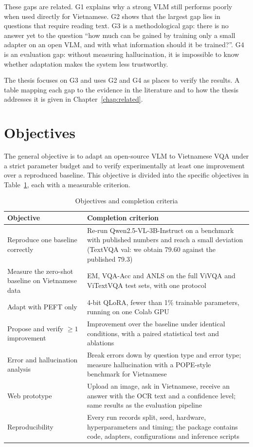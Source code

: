 These gaps are related. G1 explains why a strong VLM still performs poorly when used
directly for Vietnamese. G2 shows that the largest gap lies in questions that require
reading text. G3 is a methodological gap: there is no answer yet to the question
``how much can be gained by training only a small adapter on an open VLM, and with
what information should it be trained?''. G4 is an evaluation gap: without measuring
hallucination, it is impossible to know whether adaptation makes the system less
trustworthy.

The thesis focuses on G3 and uses G2 and G4 as places to verify the results. A table
mapping each gap to the evidence in the literature and to how the thesis addresses it
is given in Chapter~\ref{chap:related}.

\section{Objectives}
\label{sec:intro-objectives}

The general objective is to adapt an open-source VLM to Vietnamese VQA under a strict
parameter budget and to verify experimentally at least one improvement over a
reproduced baseline. This objective is divided into the specific objectives in
Table~\ref{tab:objectives}, each with a measurable criterion.

\begin{table}[htbp]
\caption{Objectives and completion criteria}
\label{tab:objectives}
\centering
\small
\begin{tabular}{p{}p{}}
\toprule
\textbf{Objective} & \textbf{Completion criterion} \\
\midrule
Reproduce one baseline correctly &
Re-run Qwen2.5-VL-3B-Instruct on a benchmark with published numbers and reach a small
deviation (TextVQA val: we obtain 79.60 against the published 79.3) \\
Measure the zero-shot baseline on Vietnamese data &
EM, VQA-Acc and ANLS on the full ViVQA and ViTextVQA test sets, with one protocol \\
Adapt with PEFT only &
4-bit QLoRA, fewer than 1\% trainable parameters, running on one Colab GPU \\
Propose and verify $\geq 1$ improvement &
Improvement over the baseline under identical conditions, with a paired statistical
test and ablations \\
Error and hallucination analysis &
Break errors down by question type and error type; measure hallucination with a
POPE-style benchmark for Vietnamese \\
Web prototype &
Upload an image, ask in Vietnamese, receive an answer with the OCR text and a
confidence level; same results as the evaluation pipeline \\
Reproducibility &
Every run records split, seed, hardware, hyperparameters and timing; the package
contains code, adapters, configurations and inference scripts \\
\bottomrule
\end{tabular}
\end{table}

